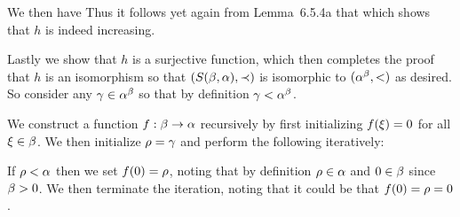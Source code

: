 {{    We then have
    Thus it follows yet again from Lemma~6.5.4a that
    which shows that $h$ is indeed increasing.

    Lastly we show that $h$ is a surjective function, which then completes the proof that $h$ is an isomorphism so that $(S(\beta,\alpha), \prec)$ is isomorphic to $(\alpha^\beta, <)$ as desired.
    So consider any $\gamma \in \alpha^\beta$ so that by definition $\gamma < \alpha^\beta$.

    We construct a function $f: \beta \to \alpha$ recursively by first initializing $f(\xi) = 0$ for all $\xi \in \beta$.
    We then initialize $\rho = \gamma$ and perform the following iteratively:

    If $\rho < \alpha$ then we set $f(0) = \rho$, noting that by definition $\rho \in \alpha$ and $0 \in \beta$ since $\beta > 0$.
    We then terminate the iteration, noting that it could be that $f(0) = \rho = 0$.

}}
